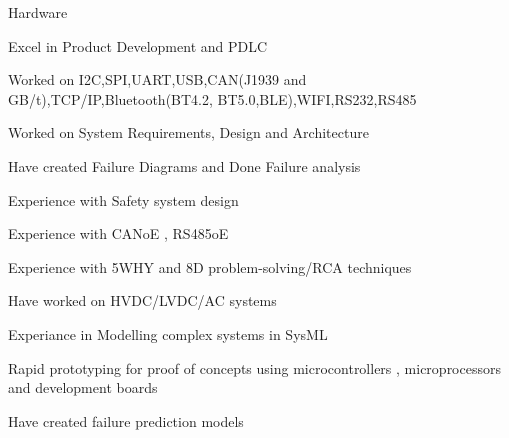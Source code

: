 

\begin{cventries}

  \cventry
    {} %
    {Hardware} %
    {} %
    {} %
    {
      \begin{cvitems} %
        \item {Excel in Product Development and PDLC}
        \item {Worked on I2C,SPI,UART,USB,CAN(J1939 and GB/t),TCP/IP,Bluetooth(BT4.2, BT5.0,BLE),WIFI,RS232,RS485}
        \item {Worked on System Requirements, Design and Architecture }
        \item {Have created Failure Diagrams and Done Failure analysis}
        \item {Experience with Safety system design }
        \item {Experience with CANoE , RS485oE }
        \item {Experience with 5WHY and 8D problem-solving/RCA techniques}
        \item {Have worked on HVDC/LVDC/AC systems}
        \item {Experiance in Modelling complex systems in SysML}
        \item {Rapid prototyping for proof of concepts using microcontrollers , microprocessors and development boards}
        \item {Have created failure prediction models}
      \end{cvitems}
    }


\end{cventries}
